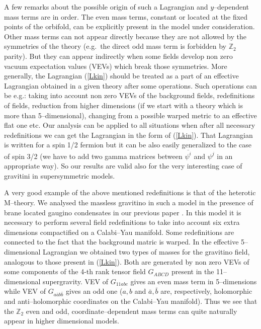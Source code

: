 \documentclass[a4paper,12pt]{article}
\def\ZZ{\mathbb Z}
\begin{document}
A few remarks about the possible origin of such a Lagrangian and 
$y$--dependent mass terms are in order. The even mass terms, constant
or located at the fixed points of the orbifold, can be explicitly
present in the model under consideration. Other mass terms can not 
appear directly because they are not allowed by the symmetries of the
theory (e.g.\ the direct odd mass term is forbidden by $\ZZ_2$
parity). But they can appear indirectly when some fields develop non
zero vacuum expectation values 
(VEVs) which break those symmetries. More generally, the Lagrangian
(\ref{Lkin}) should be treated as a part of an effective Lagrangian
obtained in a given theory after some operations. Such operations can
be e.g.: taking into account non zero VEVs of the background fields,
redefinitions of fields, reduction from higher dimensions (if we start
with a theory which is more than 5--dimensional),
changing from a possible warped metric to an effective flat one etc.
Our analysis can be applied to all situations when after all necessary
redefinitions we can get the Lagrangian in the form of (\ref{Lkin}). 
That Lagrangian is written for a spin 1/2 fermion but it can be also
easily generalized to the case of spin 3/2 (we have to add two
gamma matrices between $\overline{\psi^i}$ and $\psi^j$ in an appropriate
way). So our results are valid also for the very interesting case of
gravitini in supersymmetric models.


A very good example of the above mentioned redefinitions is that of the
heterotic M--theory. We analysed the massless gravitino in such a model
in the presence of brane located gaugino condensates in our previous
paper \cite{Meissner:1999ja}. In this model it is necessary to perform
several field redefinitions to take into account six extra dimensions
compactified on a Calabi--Yau manifold. Some redefinitions are
connected to the fact that the background matric is warped. In the
effective 5--dimensional Lagrangian we obtained two types of masses
for the gravitino field, analogous to those present in (\ref{Lkin}).
Both are generated by non zero VEVs of some components of the 4-th
rank tensor field $G_{ABCD}$ present in the 11--dimensional
supergravity. VEV of $G_{11abc}$ gives an even mass term in
5--dimensions while VEV of $G_{a\bar ab\bar b}$ gives an odd one
($a,b$ and $\bar a,\bar b$ are, 
respectively, holomorphic and anti--holomorphic coordinates on the
Calabi--Yau manifold). Thus we see that the $\ZZ_2$ even and odd,
coordinate--dependent mass terms can quite naturally appear in
higher dimensional models.
\end{document}
